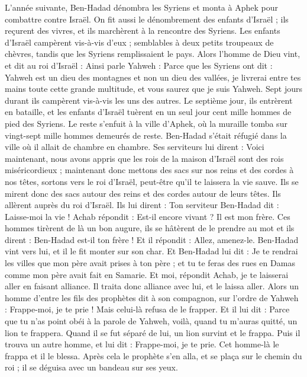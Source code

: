 \begin{multicols}{2}
L’année suivante, Ben-Hadad dénombra les Syriens et monta à Aphek pour combattre contre Israël.
On fit aussi le dénombrement des enfants d'Israël ; ils reçurent des vivres, et ils marchèrent à la rencontre des Syriens. Les enfants d'Israël campèrent vis-à-vis d'eux ; semblables à deux petits troupeaux de chèvres, tandis que les Syriens remplissaient le pays.
Alors l'homme de Dieu vint, et dit au roi d'Israël : Ainsi parle Yahweh : Parce que les Syriens ont dit : Yahweh est un dieu des montagnes et non un dieu des vallées, je livrerai entre tes mains toute cette grande multitude, et vous saurez que je suis Yahweh.
Sept jours durant ils campèrent vis-à-vis les uns des autres. Le septième jour, ils entrèrent en bataille, et les enfants d'Israël tuèrent en un seul jour cent mille hommes de pied des Syriens.
Le reste s'enfuit à la ville d'Aphek, où la muraille tomba sur vingt-sept mille hommes demeurés de reste. Ben-Hadad s'était réfugié dans la ville où il allait de chambre en chambre.
Ses serviteurs lui dirent : Voici maintenant, nous avons appris que les rois de la maison d'Israël sont des rois miséricordieux ; maintenant donc mettons des sacs sur nos reins et des cordes à nos têtes, sortons vers le roi d'Israël, peut-être qu'il te laissera la vie sauve.
Ils se mirent donc des sacs autour des reins et des cordes autour de leurs têtes. Ils allèrent auprès du roi d'Israël. Ils lui dirent : Ton serviteur Ben-Hadad dit : Laisse-moi la vie ! Achab répondit : Est-il encore vivant ? Il est mon frère.
Ces hommes tirèrent de là un bon augure, ils se hâtèrent de le prendre au mot et ils dirent : Ben-Hadad est-il ton frère ! Et il répondit : Allez, amenez-le. Ben-Hadad vint vers lui, et il le fit monter sur son char.
Et Ben-Hadad lui dit : Je te rendrai les villes que mon père avait prises à ton père ; et tu te feras des rues en Damas comme mon père avait fait en Samarie. Et moi, répondit Achab, je te laisserai aller en faisant alliance. Il traita donc alliance avec lui, et le laissa aller.
Alors un homme d'entre les fils des prophètes dit à son compagnon, sur l’ordre de Yahweh : Frappe-moi, je te prie ! Mais celui-là refusa de le frapper.
Et il lui dit : Parce que tu n'as point obéi à la parole de Yahweh, voilà, quand tu m’auras quitté, un lion te frappera. Quand il se fut séparé de lui, un lion survint et le frappa.
Puis il trouva un autre homme, et lui dit : Frappe-moi, je te prie. Cet homme-là le frappa et il le blessa.
Après cela le prophète s'en alla, et se plaça sur le chemin du roi ; il se déguisa avec un bandeau sur ses yeux.

\end{multicols}
